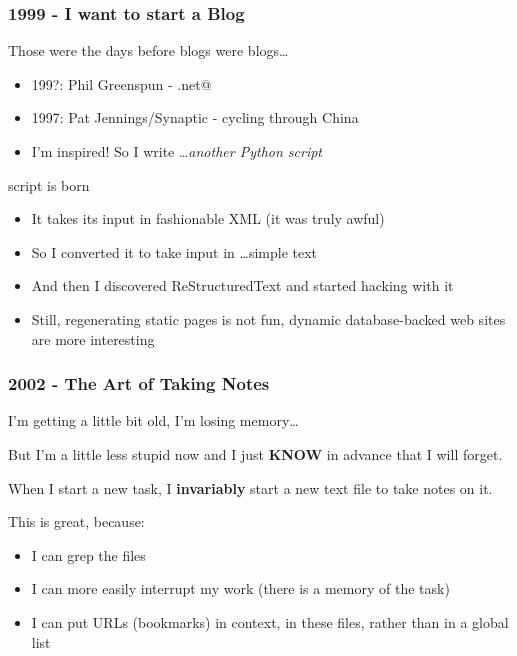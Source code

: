 \documentclass[compress,trans]{beamer}
\begin{document}
\begin{frame}[fragile]
  \frametitle{1999 - I want to start a Blog}

  Those were the days before blogs were blogs\dots

  \begin{itemize}
  \item 199?: Phil Greenspun - \verb@photo.net@
  \item 1997: Pat Jennings/Synaptic - cycling through China
  \item I'm inspired!  \quad So I write \dots \emph{another Python script}
  \end{itemize}

\vfill\pause

  \verb@adventures@ script is born
  \begin{itemize}
    \item It takes its input in fashionable XML (it was truly awful)
    \item So I converted it to take input in \dots simple text
    \item And then I discovered ReStructuredText and started hacking with it
    \item Still, regenerating static pages is not fun, dynamic database-backed
      web sites are more interesting
  \end{itemize}

\end{frame}


\begin{frame}[fragile]
  \frametitle{2002 - The Art of Taking Notes}

  I'm getting a little bit old, I'm losing memory\dots

\vfill 
  But I'm a little less stupid now and I just \textbf{KNOW} in advance that I
  will forget.

\vfill
  When I start a new task, I \textbf{invariably} start a new text file to take
  notes on it.

\vfill
  This is great, because:
  \begin{itemize}
    \item I can grep the files
    \item I can more easily interrupt my work (there is a memory of the task)
    \item I can put URLs (bookmarks) in context, in these files, rather than in
      a global list
  \end{itemize}

\end{frame}
\end{document}
